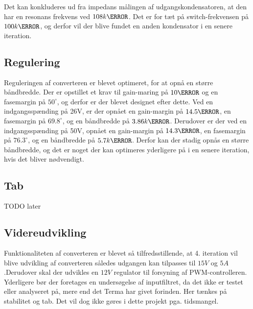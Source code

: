 Det kan konkluderes ud fra impedans målingen af udgangskondensatoren, at den har en resonans frekvens ved $108k\hertz$. Det er for tæt på switch-frekvensen på $100k\hertz$, og derfor vil der blive fundet en anden kondensator i en senere iteration.



\subsection{Regulering}
Reguleringen af converteren er blevet optimeret, for at opnå en større båndbredde. Der er opstillet et krav til gain-maring på $10\decibel$ og en fasemargin på $50^\circ$, og derfor er der blevet designet efter dette. Ved en indgangsspænding på 26V, er der opnået en gain-margin på $14.5\decibel$, en fasemargin på $69.8^\circ$, og en båndbredde på $3.86k\hertz$. Derudover er der ved en indgangsspænding på 50V, opnået en gain-margin på $14.3\decibel$, en fasemargin på $76.3^\circ$, og en båndbredde på $5.7k\hertz$. Derfor kan der stadig opnås en større båndbredde, og det er noget der kan optimeres yderligere på i en senere iteration, hvis det bliver nødvendigt.


\subsection{Tab}
TODO later


\subsection{Videreudvikling}
Funktionaliteten af converteren er blevet så tilfredsstillende, at 4. iteration vil blive udvikling af converteren således udgangen kan tilpasses til $15V$ og $5A$.Derudover skal der udvikles en $12V$ regulator til forsyning af PWM-controlleren. Yderligere bør der foretages en undersøgelse af inputfiltret, da det ikke er testet eller analyseret på, mere end det Terma har givet forinden. Her tænkes på stabilitet og tab. Det vil dog ikke gøres i dette projekt pga. tidsmangel. 





